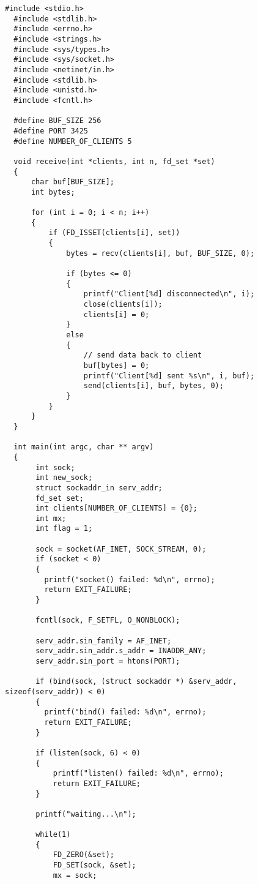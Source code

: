 \documentclass[a4paper,14pt]{extreport} %
\begin{document}
\begin{lstlisting}[caption=Код сервера netserver.c]
  #include <stdio.h>
  #include <stdlib.h>
  #include <errno.h>
  #include <strings.h>
  #include <sys/types.h> 
  #include <sys/socket.h>
  #include <netinet/in.h>
  #include <stdlib.h>
  #include <unistd.h>
  #include <fcntl.h>

  #define BUF_SIZE 256
  #define PORT 3425
  #define NUMBER_OF_CLIENTS 5

  void receive(int *clients, int n, fd_set *set)
  {
      char buf[BUF_SIZE];
      int bytes;
      
      for (int i = 0; i < n; i++)
      {
          if (FD_ISSET(clients[i], set))
          {
              bytes = recv(clients[i], buf, BUF_SIZE, 0);
     
              if (bytes <= 0)
              {
                  printf("Client[%d] disconnected\n", i);
                  close(clients[i]);
                  clients[i] = 0;
              }
              else
              {
                  // send data back to client
                  buf[bytes] = 0;
                  printf("Client[%d] sent %s\n", i, buf);
                  send(clients[i], buf, bytes, 0);
              }
          }
      }
  }

  int main(int argc, char ** argv)
  {
       int sock;
       int new_sock;
       struct sockaddr_in serv_addr;
       fd_set set;
       int clients[NUMBER_OF_CLIENTS] = {0};
       int mx;
       int flag = 1;

       sock = socket(AF_INET, SOCK_STREAM, 0);
       if (socket < 0)
       {
         printf("socket() failed: %d\n", errno);
         return EXIT_FAILURE;
       }

       fcntl(sock, F_SETFL, O_NONBLOCK);

       serv_addr.sin_family = AF_INET;
       serv_addr.sin_addr.s_addr = INADDR_ANY;
       serv_addr.sin_port = htons(PORT);

       if (bind(sock, (struct sockaddr *) &serv_addr, sizeof(serv_addr)) < 0)
       {
         printf("bind() failed: %d\n", errno);
         return EXIT_FAILURE;
       }

       if (listen(sock, 6) < 0)
       {
           printf("listen() failed: %d\n", errno);
           return EXIT_FAILURE;
       }

       printf("waiting...\n");

       while(1)
       {
           FD_ZERO(&set);
           FD_SET(sock, &set);
           mx = sock;
           

\end{lstlisting}
\end{document}
